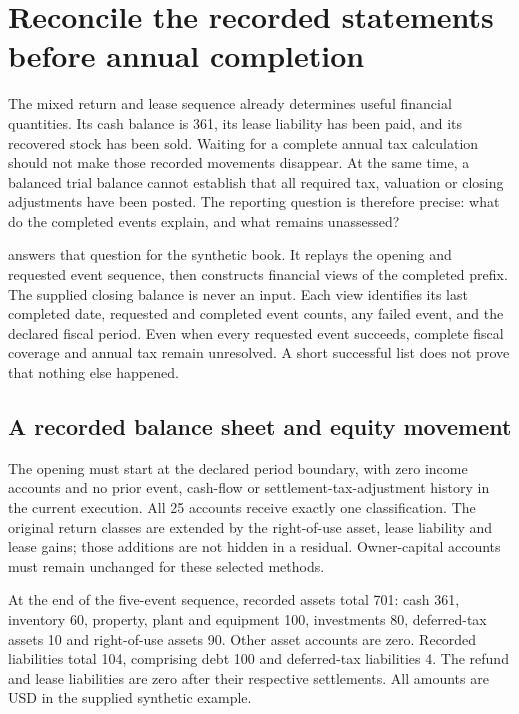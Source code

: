 
\section{Reconcile the recorded statements before annual completion}
\label{sec:recorded-shared-statements}

The mixed return and lease sequence already determines useful financial
quantities. Its cash balance is 361, its lease liability has been paid, and its
recovered stock has been sold. Waiting for a complete annual tax calculation
should not make those recorded movements disappear. At the same time, a
balanced trial balance cannot establish that all required tax, valuation or
closing adjustments have been posted. The reporting question is therefore
precise: what do the completed events explain, and what remains unassessed?

 answers that question for the synthetic
book. It replays the opening and requested event sequence, then constructs
financial views of the completed prefix. The supplied closing balance is never
an input. Each view identifies its last completed date, requested and completed
event counts, any failed event, and the declared fiscal period. Even when every
requested event succeeds, complete fiscal coverage and annual tax remain
unresolved. A short successful list does not prove that nothing else happened.

\subsection{A recorded balance sheet and equity movement}

The opening must start at the declared period boundary, with zero income
accounts and no prior event, cash-flow or settlement-tax-adjustment history in
the current execution. All 25 accounts receive exactly one classification.
The original return classes are extended by the right-of-use asset, lease
liability and lease gains; those additions are not hidden in a residual.
Owner-capital accounts must remain unchanged for these selected methods.

At the end of the five-event sequence, recorded assets total 701: cash 361,
inventory 60, property, plant and equipment 100, investments 80, deferred-tax
assets 10 and right-of-use assets 90. Other asset accounts are zero. Recorded
liabilities total 104, comprising debt 100 and deferred-tax liabilities 4.
The refund and lease liabilities are zero after their respective settlements.
All amounts are USD in the supplied synthetic example.

